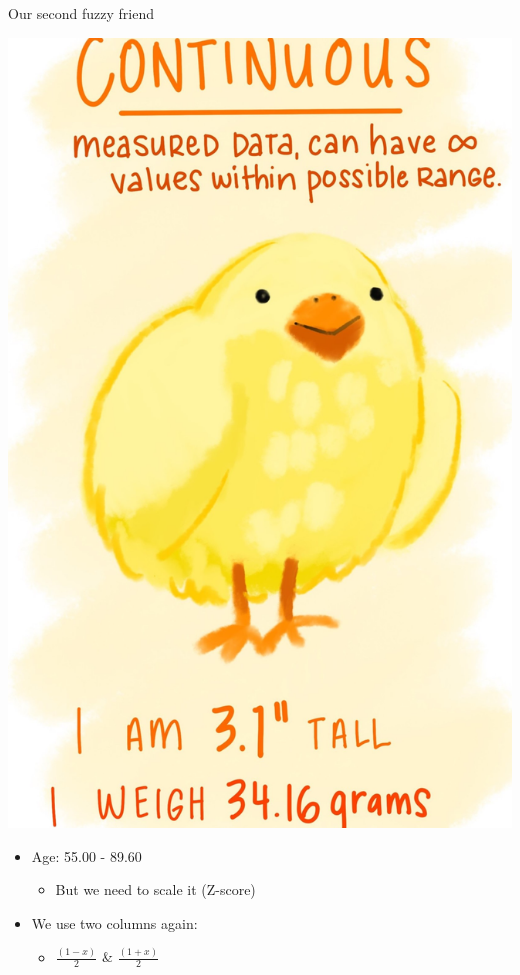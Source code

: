 \documentclass[
  ignorenonframetext,
]{beamer}
\providecommand{\tightlist}{%
  \setlength{\itemsep}{0pt}\setlength{\parskip}{0pt}}
\begin{document}
\begin{frame}{Our second fuzzy friend}
\protect\hypertarget{our-second-fuzzy-friend}{}

\begin{center}
\includegraphics{../images/cont_copy.jpg}
\end{center}

\end{frame}

\begin{frame}

\begin{itemize}[<+->]
\tightlist
\item
  Age: 55.00 - 89.60

  \begin{itemize}[<+->]
  \tightlist
  \item
    But we need to scale it (Z-score)
  \end{itemize}
\item
  We use two columns again:

  \begin{itemize}[<+->]
  \tightlist
  \item
    \(\frac{(1 - x)}{2}\) \& \(\frac{(1 + x)}{2}\)
  \end{itemize}
\end{itemize}

\end{frame}
\end{document}
